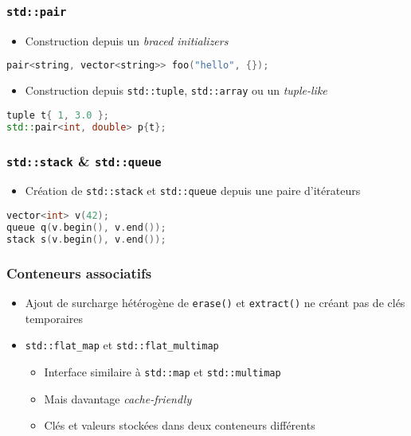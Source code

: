 \documentclass[C++.tex]{subfiles}
\begin{document}
\begin{frame}[fragile]
	\frametitle{\lstinline|std::pair|}
	\begin{itemize}
		\item Construction depuis un \textit{braced initializers}


	\end{itemize}

	\begin{lstlisting}[language=C++]
pair<string, vector<string>> foo("hello", {});\end{lstlisting}

	\begin{itemize}
		\item Construction depuis \lstinline|std::tuple|, \lstinline|std::array| ou un \textit{tuple-like}
	\end{itemize}

	\begin{lstlisting}[language=C++]
tuple t{ 1, 3.0 };
std::pair<int, double> p{t};\end{lstlisting}
\end{frame}

\begin{frame}[fragile]
	\frametitle{\lstinline|std::stack| \& \lstinline|std::queue|}
	\begin{itemize}
		\item Création de \lstinline|std::stack| et \lstinline|std::queue| depuis une paire d'itérateurs
	\end{itemize}

	\begin{lstlisting}[language=C++]
vector<int> v(42);
queue q(v.begin(), v.end());
stack s(v.begin(), v.end());\end{lstlisting}
\end{frame}

\begin{frame}[fragile]
	\frametitle{Conteneurs associatifs}
	\begin{itemize}
		\item Ajout de surcharge hétérogène de \lstinline|erase()| et \lstinline|extract()| ne créant pas de clés temporaires
		\item \lstinline|std::flat_map| et \lstinline|std::flat_multimap|
		\begin{itemize}
			\item Interface similaire à \lstinline|std::map| et \lstinline|std::multimap|
			\item Mais davantage \textit{cache-friendly}
			\item Clés et valeurs stockées dans deux conteneurs différents
		\end{itemize}
	\end{itemize}
\end{frame}
\end{document}
